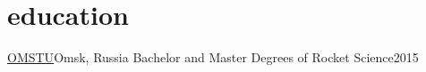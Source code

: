 \section{education}
\resumeSubHeadingListStart

\resumeSubheading
{\href{https://omgtu.ru/}{OMSTU}}{Omsk, Russia}
{Bachelor and Master Degrees of Rocket Science}{2015}

\resumeSubHeadingListEnd